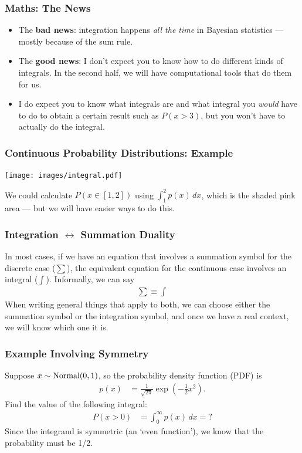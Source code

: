 \documentclass{beamer}
\begin{document}
\begin{frame}
\frametitle{Maths: The News}
\begin{itemize}
\item The {\bf bad news}: integration happens {\em all the time} in Bayesian
statistics --- mostly because of the sum rule. \\[0.5em]\pause
\item The {\bf good news}: I don't expect you to know how to do different
kinds of integrals. In the second half, we will have computational tools that
do them for us.\\[0.5em]\pause
\item I do expect you to know what integrals are and what integral you
{\em would} have to do to obtain a certain result such as $P(x > 3)$, but you
won't have to actually do the integral.
\end{itemize}

\end{frame}


\begin{frame}
\frametitle{Continuous Probability Distributions: Example}

\begin{center}
\texttt{[image: images/integral.pdf]}
\end{center}
We could calculate $P(x \in [1, 2])$ using $\int_1^2 p(x) \, dx$, which is
the shaded pink area --- but we will have easier ways to do this.


\end{frame}


\begin{frame}
\frametitle{Integration $\leftrightarrow$ Summation Duality}
In most cases, if we have an equation that involves a summation symbol
for the discrete case ($\sum$), the equivalent equation for the continuous
case involves an integral ($\int$).
Informally, we can say
\begin{align}
\sum \equiv \int
\end{align}\pause
When writing general things that apply to both, we can choose either the
summation symbol or the integration symbol, and once we have a real context,
we will know which one it is.

\end{frame}


\begin{frame}
\frametitle{Example Involving Symmetry}
Suppose $x \sim \textnormal{Normal}(0, 1)$, so the probability density function
(PDF) is
\begin{align}
p(x) &= \frac{1}{\sqrt{2\pi}}\exp\left(-\frac{1}{2}x^2\right).
\end{align}
Find the value of the following integral:
\begin{align}
P(x > 0) &= \int_0^\infty p(x) \, dx = ?
\end{align}\pause
Since the integrand is symmetric (an `even function'), we know that the
probability must be 1/2.

\end{frame}
\end{document}
